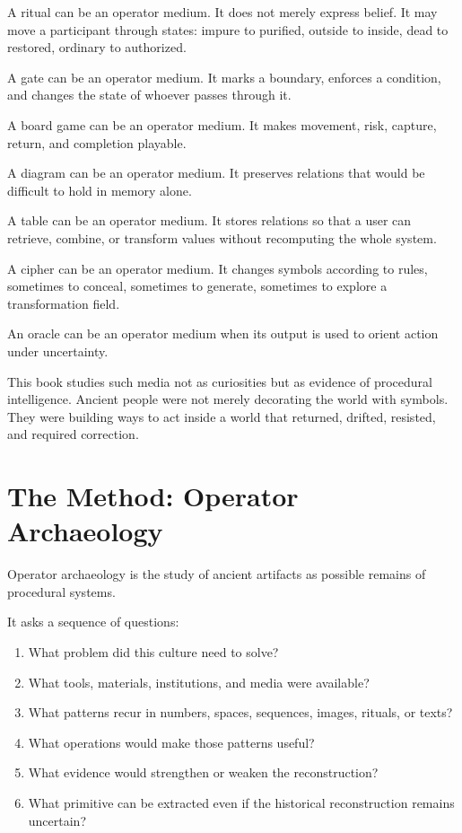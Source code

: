 \documentclass[11pt]{book}
\begin{document}
A ritual can be an operator medium. It does not merely express belief. It may move a participant through states: impure to purified, outside to inside, dead to restored, ordinary to authorized.

A gate can be an operator medium. It marks a boundary, enforces a condition, and changes the state of whoever passes through it.

A board game can be an operator medium. It makes movement, risk, capture, return, and completion playable.

A diagram can be an operator medium. It preserves relations that would be difficult to hold in memory alone.

A table can be an operator medium. It stores relations so that a user can retrieve, combine, or transform values without recomputing the whole system.

A cipher can be an operator medium. It changes symbols according to rules, sometimes to conceal, sometimes to generate, sometimes to explore a transformation field.

An oracle can be an operator medium when its output is used to orient action under uncertainty.

This book studies such media not as curiosities but as evidence of procedural intelligence. Ancient people were not merely decorating the world with symbols. They were building ways to act inside a world that returned, drifted, resisted, and required correction.

\section{The Method: Operator Archaeology}

Operator archaeology is the study of ancient artifacts as possible remains of procedural systems.

It asks a sequence of questions:

\begin{enumerate}[label=\arabic*.]
    \item What problem did this culture need to solve?
    \item What tools, materials, institutions, and media were available?
    \item What patterns recur in numbers, spaces, sequences, images, rituals, or texts?
    \item What operations would make those patterns useful?
    \item What evidence would strengthen or weaken the reconstruction?
    \item What primitive can be extracted even if the historical reconstruction remains uncertain?
\end{enumerate}
\end{document}
